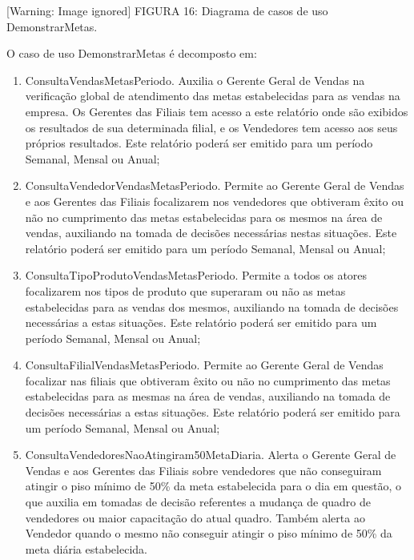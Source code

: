 \documentclass[a4paper]{article}
\newcommand\liststyleWWviiiNumviii{%
\renewcommand\theenumi{\alph{enumi}}
\renewcommand\theenumii{\alph{enumii}}
\renewcommand\theenumiii{\roman{enumiii}}
\renewcommand\theenumiv{\arabic{enumiv}}
\renewcommand\labelenumi{\theenumi)}
\renewcommand\labelenumii{\theenumii.}
\renewcommand\labelenumiii{\theenumiii.}
\renewcommand\labelenumiv{\theenumiv.}
}
\begin{document}
\bigskip

{
  [Warning: Image ignored] %
 \textsf{\MakeUppercase{\newline
FIGURA 16}}\textsf{: Diagrama de casos de uso DemonstrarMetas. }}

{
\textsf{O caso de uso DemonstrarMetas \'e decomposto em:}}

\liststyleWWviiiNumviii
\begin{enumerate}
\item {
\textsf{ConsultaVendasMetasPeriodo. Auxilia o Gerente Geral de Vendas na verifica\c{c}\~ao global de atendimento das
metas estabelecidas para as vendas na empresa. Os Gerentes das Filiais tem acesso a este relat\'orio onde s\~ao
exibidos os resultados de sua determinada filial, e os Vendedores tem acesso aos seus pr\'oprios resultados. Este
relat\'orio poder\'a ser emitido para um per\'iodo Semanal, Mensal ou Anual;}}
\item {
\textsf{ConsultaVendedorVendasMetasPeriodo. Permite ao Gerente Geral de Vendas e aos Gerentes das Filiais focalizarem
nos vendedores que obtiveram \^exito ou n\~ao no cumprimento das metas estabelecidas para os mesmos na \'area de
vendas, auxiliando na tomada de decis\~oes necess\'arias nestas situa\c{c}\~oes. Este relat\'orio poder\'a ser emitido
para um per\'iodo Semanal, Mensal ou Anual;}}
\item {
\textsf{ConsultaTipoProdutoVendasMetasPeriodo. Permite a todos os atores focalizarem nos tipos de produto que superaram
ou n\~ao as metas estabelecidas para as vendas dos mesmos, auxiliando na tomada de decis\~oes necess\'arias a estas
}\textsf{situa\c{c}\~oes. Este relat\'orio poder\'a ser emitido para um per\'iodo Semanal, Mensal ou Anual;}}
\item {
\textsf{ConsultaFilialVendasMetasPeriodo. Permite ao Gerente Geral de Vendas focalizar nas filiais que obtiveram \^exito
ou n\~ao no cumprimento das metas estabelecidas para as mesmas na \'area de vendas, auxiliando na tomada de decis\~oes
necess\'arias a estas situa\c{c}\~oes. Este relat\'orio poder\'a ser emitido para um per\'iodo Semanal, Mensal ou
Anual;}}
\item {
\textsf{ConsultaVendedoresNaoAtingiram50MetaDiaria. Alerta o Gerente Geral de Vendas e aos Gerentes das Filiais sobre
vendedores que n\~ao conseguiram atingir o piso m\'inimo de 50\% da meta estabelecida para o dia em quest\~ao, o que
auxilia em tomadas de decis\~ao referentes a mudan\c{c}a de quadro de vendedores ou maior capacita\c{c}\~ao do atual
quadro. Tamb\'em alerta ao Vendedor quando o mesmo n\~ao conseguir atingir o piso m\'inimo de 50\% da meta di\'aria
estabelecida. \newline
}}
\end{enumerate}
\end{document}
